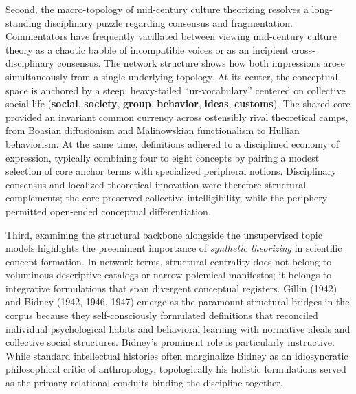 \documentclass[11pt]{article}
\begin{document}
Second, the macro-topology of mid-century culture theorizing resolves a long-standing disciplinary puzzle regarding consensus and fragmentation. Commentators have frequently vacillated between viewing mid-century culture theory as a chaotic babble of incompatible voices or as an incipient cross-disciplinary consensus. The network structure shows how both impressions arose simultaneously from a single underlying topology. At its center, the conceptual space is anchored by a steep, heavy-tailed ``ur-vocabulary'' centered on collective social life (\textbf{social}, \textbf{society}, \textbf{group}, \textbf{behavior}, \textbf{ideas}, \textbf{customs}). The shared core provided an invariant common currency across ostensibly rival theoretical camps, from Boasian diffusionism and Malinowskian functionalism to Hullian behaviorism. At the same time, definitions adhered to a disciplined economy of expression, typically combining four to eight concepts by pairing a modest selection of core anchor terms with specialized peripheral notions. Disciplinary consensus and localized theoretical innovation were therefore structural complements; the core preserved collective intelligibility, while the periphery permitted open-ended conceptual differentiation.

Third, examining the structural backbone alongside the unsupervised topic models highlights the preeminent importance of \emph{synthetic theorizing} in scientific concept formation. In network terms, structural centrality does not belong to voluminous descriptive catalogs or narrow polemical manifestos; it belongs to integrative formulations that span divergent conceptual registers. Gillin (1942) and Bidney (1942, 1946, 1947) emerge as the paramount structural bridges in the corpus because they self-consciously formulated definitions that reconciled individual psychological habits and behavioral learning with normative ideals and collective social structures. Bidney's prominent role is particularly instructive. While standard intellectual histories often marginalize Bidney as an idiosyncratic philosophical critic of anthropology, topologically his holistic formulations served as the primary relational conduits binding the discipline together.
\end{document}
